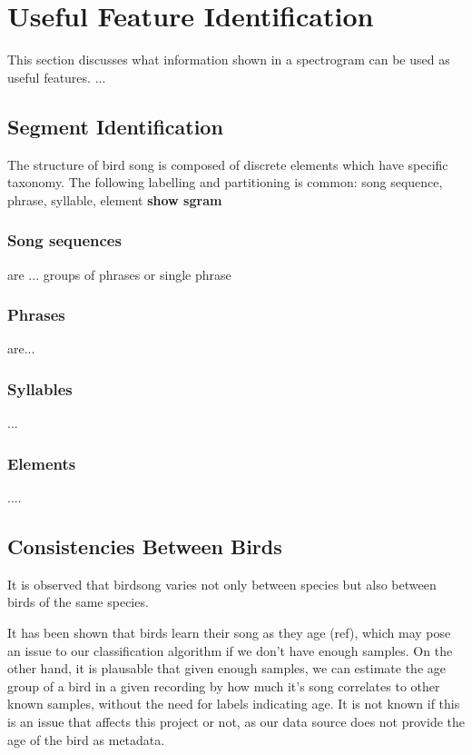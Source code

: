 \section{Useful Feature Identification}
This section discusses what information shown in a spectrogram can be used as
useful features. ...

\subsection{Segment Identification}
The structure of bird song is composed of discrete elements which have specific
taxonomy.
The following labelling and partitioning is common:
song sequence, phrase, syllable, element \textbf{show sgram}

\subsubsection{Song sequences}
are ... groups of phrases or single phrase

\subsubsection{Phrases}
are...

\subsubsection{Syllables}
...

\subsubsection{Elements}
....


\subsection{Consistencies Between Birds}
It is observed that birdsong varies not only between species but also between
birds of the same species.

It has been shown that birds learn their song as they age (ref), which may pose
an issue to our classification algorithm if we don't have enough samples.
On the other hand, it is plausable that given enough samples, we can estimate
the age group of a bird in a given recording by how much it's song correlates
to other known samples, without the need for labels indicating age.
It is not known if this is an issue that affects this project or not, as our
data source does not provide the age of the bird as metadata.

